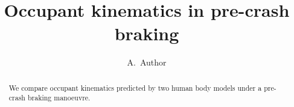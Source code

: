 \documentclass[11pt,a4paper]{article}
\title{Occupant kinematics in pre-crash braking}
\author{A.~Author}
\date{}
\begin{document}
\maketitle

\begin{abstract}
We compare occupant kinematics predicted by two human body models under a
pre-crash braking manoeuvre.
\end{abstract}





\printnomenclature
\printglossary[type=\acronymtype]



\end{document}
